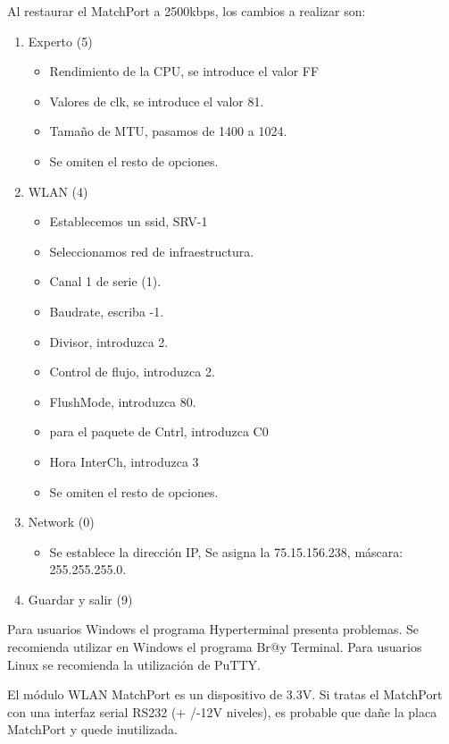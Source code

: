 Al restaurar el MatchPort a 2500kbps, los cambios a realizar son:

\begin{enumerate}
\item Experto (5)
  \begin{itemize}
  \item Rendimiento de la CPU, se introduce el valor FF
  \item Valores de  clk, se introduce el valor 81.
  \item Tamaño de MTU, pasamos de 1400 a 1024.
  \item Se omiten el resto de opciones.
  \end{itemize}
\item WLAN (4) 
  \begin{itemize}
  \item Establecemos un ssid, SRV-1
  \item Seleccionamos red de infraestructura.
  \item Canal 1 de serie (1).
  \item Baudrate, escriba -1.
  \item Divisor, introduzca 2.
  \item Control de flujo, introduzca 2.
  \item FlushMode, introduzca 80.
  \item para el paquete de Cntrl, introduzca C0
  \item Hora InterCh, introduzca 3
  \item Se omiten el resto de opciones.
  \end{itemize}
\item Network (0) 
  \begin{itemize}
  \item Se establece la dirección IP, Se asigna la 75.15.156.238, máscara: 255.255.255.0.
  \end{itemize}
\item Guardar y salir (9)
\end{enumerate}

\begin{fondo}
  \begin{nota}
    Para usuarios Windows el programa Hyperterminal presenta problemas. Se recomienda utilizar en Windows el programa Br@y Terminal.
    Para usuarios Linux se recomienda la utilización de PuTTY.
  \end{nota}
\end{fondo}

\begin{fondo}
  \begin{nota}
    El módulo WLAN MatchPort es un dispositivo de 3.3V. Si tratas el MatchPort con una interfaz serial RS232 (+ /-12V niveles), es probable que dañe la placa MatchPort y quede inutilizada.
  \end{nota}
\end{fondo}

